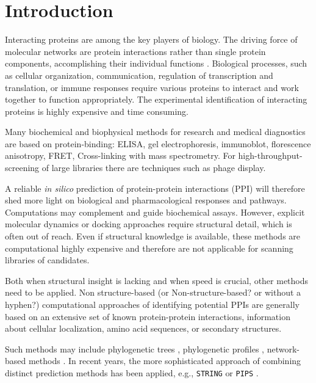 \documentclass{bioinfo}
\newcommand{\TODO}[1] {\begingroup\color{red}#1\endgroup}
\begin{document}
\maketitle




\section{Introduction}

Interacting proteins are among the key players of biology. The driving
force of molecular networks are protein interactions rather than
single protein components, accomplishing their individual functions
\citep{Pawson:2004}. Biological processes, such as cellular
organization, communication, regulation of transcription and
translation, or immune responses require various proteins to interact
and work together to function appropriately. The experimental
identification of interacting proteins is highly expensive and time
consuming.

Many biochemical and biophysical methods for research and medical diagnostics are based on protein-binding:
ELISA,
gel electrophoresis, immunoblot, florescence anisotropy, FRET,
Cross-linking with mass spectrometry. For high-throughput-screening of
large libraries there are techniques such as phage display. 

A reliable \textit{in silico} prediction of protein-protein
interactions (PPI) will therefore shed more light on biological and
pharmacological responses and pathways. Computations may complement
and guide biochemical assays. However, explicit molecular dynamics or
docking approaches require structural detail, which is often out of
reach. Even if structural knowledge is available, these methods are
computational highly expensive and therefore are not applicable for
scanning libraries of candidates. 

Both when structural insight is lacking and when speed is crucial,
other methods need to be applied. \TODO{Non structure-based (or Non-structure-based? or without a hyphen?)} computational
approaches of identifying potential PPIs are generally based on an
extensive set of known protein-protein interactions, information about
cellular localization, amino acid sequences, or secondary structures.

Such methods may include phylogenetic trees \citep{Pazos:2001},
phylogenetic profiles \citep{Barker:2005}, network-based methods
\citep{Yook:2004, Clauset:2008}. In recent years, the more
sophisticated approach of combining distinct prediction methods has
been applied, e.g., \texttt{STRING} \citep{Szklarczyk:2011} or
\texttt{PIPS} \citep{McDowall:2009}.
\end{document}

